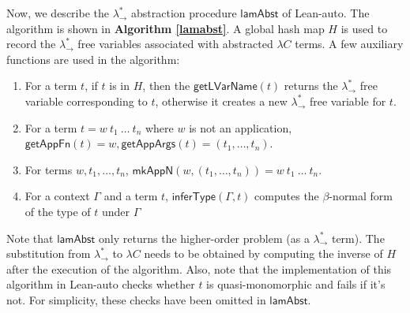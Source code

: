 Now, we describe the $\lambda_\to^*$ abstraction procedure $\mathsf{lamAbst}$ of Lean-auto. The algorithm
is shown in \textbf{Algorithm \ref{lamabst}}. A global hash map $H$ is used to record the $\lambda_\to^*$
free variables associated with abstracted $\lambda C$ terms. A few auxiliary functions are used in the algorithm:
\begin{enumerate}
  \item For a term $t$, if $t$ is in $H$, then the $\mathsf{getLVarName}(t)$ returns
    the $\lambda_\to^*$ free variable corresponding to $t$, otherwise it creates a new $\lambda_\to^*$ free variable for $t$.
  \item For a term $t = w \ t_1 \ \dots \ t_n$ where $w$ is not an application,
    $\mathsf{getAppFn}(t) = w, \mathsf{getAppArgs}(t) = (t_1, \dots, t_n)$.
  \item For terms $w, t_1, \dots, t_n$, $\mathsf{mkAppN}(w, (t_1, \dots, t_n)) = w \ t_1 \ \dots \ t_n$.
  \item For a context $\Gamma$ and a term $t$, $\mathsf{inferType}(\Gamma, t)$ computes the
    $\beta$-normal form of the type of $t$ under $\Gamma$
\end{enumerate}
Note that $\mathsf{lamAbst}$ only returns the higher-order problem (as a $\lambda_\to^*$ term). The
substitution from $\lambda_\to^*$ to $\lambda C$ needs to be obtained by computing the inverse of $H$ after
the execution of the algorithm. Also, note that the implementation of this algorithm in Lean-auto checks
whether $t$ is quasi-monomorphic and fails if it's not. For simplicity, these checks have been omitted in $\mathsf{lamAbst}$.

